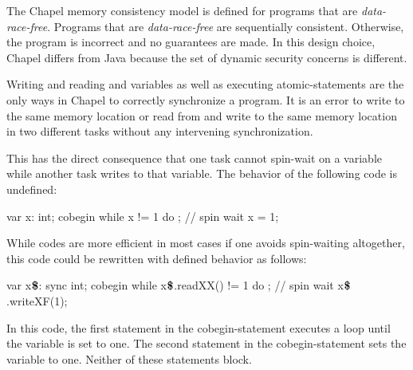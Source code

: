 The Chapel memory consistency model is defined for programs that are
{\em data-race-free}.  Programs that are {\em data-race-free} are
sequentially consistent.  Otherwise, the program is incorrect and no
guarantees are made.  In this design choice, Chapel differs from Java
because the set of dynamic security concerns is different.

Writing and reading  and  variables as well as
executing atomic-statements are the only ways in Chapel to correctly
synchronize a program.  It is an error to write to the same memory
location or read from and write to the same memory location in two
different tasks without any intervening synchronization.

\begin{example}
This has the direct consequence that one task cannot spin-wait on a
variable while another task writes to that variable.  The behavior of
the following code is undefined:
\begin{chapel}
var x: int;
cobegin {
  while x != 1 do ;  // spin wait
  x = 1;
}
\end{chapel}
While codes are more efficient in most cases if one avoids
spin-waiting altogether, this code could be rewritten with defined
behavior as follows:
\begin{chapel}
var x$\mbox{{\bf \$}}$: sync int;
cobegin {
  while x$\mbox{{\bf \$}}$.readXX() != 1 do ;  // spin wait
  x$\mbox{{\bf \$}}$.writeXF(1);
}
\end{chapel}
In this code, the first statement in the cobegin-statement executes a
loop until the variable is set to one.  The second statement in the
cobegin-statement sets the variable to one.  Neither of these
statements block.
\end{example}
